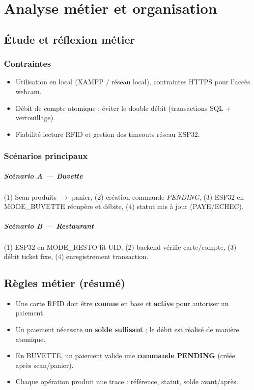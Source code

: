 \documentclass[12pt,a4paper]{report}
\begin{document}
\chapter{Analyse métier et organisation}
\section{Étude et réflexion métier}
\subsection{Contraintes}
\begin{itemize}
  \item Utilisation en local (XAMPP / réseau local), contraintes HTTPS pour l’accès webcam.
  \item Débit de compte atomique : éviter le double débit (transactions SQL + verrouillage).
  \item Fiabilité lecture RFID et gestion des timeouts réseau ESP32.
\end{itemize}

\subsection{Scénarios principaux}
\paragraph{Scénario A — Buvette}
(1) Scan produits \(\rightarrow\) panier, (2) création commande \textit{PENDING}, (3) ESP32 en MODE\_BUVETTE récupère et débite, (4) statut mis à jour (PAYE/ECHEC).

\paragraph{Scénario B — Restaurant}
(1) ESP32 en MODE\_RESTO lit UID, (2) backend vérifie carte/compte, (3) débit ticket fixe, (4) enregistrement transaction.

\section{Règles métier (résumé)}
\begin{itemize}
  \item Une carte RFID doit être \textbf{connue} en base et \textbf{active} pour autoriser un paiement.
  \item Un paiement nécessite un \textbf{solde suffisant} ; le débit est réalisé de manière atomique.
  \item En BUVETTE, un paiement valide une \textbf{commande PENDING} (créée après scan/panier).
  \item Chaque opération produit une trace : référence, statut, solde avant/après.
\end{itemize}
\end{document}
